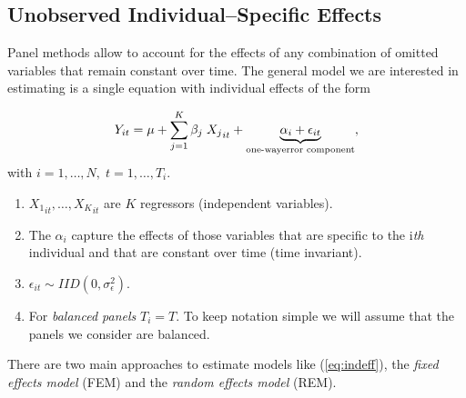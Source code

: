 \documentclass[landscape,letterpaper,9pt]{article}
\begin{document}
\newpage
\subsection{Unobserved Individual--Specific Effects}
Panel methods allow to account for the effects of any combination of
omitted variables that remain constant over time.
The general model we are interested in estimating is a single equation
with individual effects of the form

\begin{equation}\label{eq:modd}
Y_{it} = \mu +
\sum_{j= 1}^{K} \beta_{j} \; {X_{j}}_{it} + \underbrace{\alpha_i +\epsilon_{it}}_{\text{one-way\\ error component} },
\end{equation}
%
%
with \(i=1, \ldots, N, \; t= 1, \ldots, T_i\).
\begin{enumerate}
\item ${X_{1}}_{it}, \ldots, {X_{K}}_{it}$ are \(K\) regressors (independent variables).
\item The \(\alpha_i\)
capture the effects of those variables that are specific to the i\emph{th} individual
and that are constant over time (time invariant).
\item \(\epsilon_{it} \sim IID(0,\sigma^2_\epsilon) \).
\item  For \emph{balanced panels} \(T_i=T\). To keep notation simple we will
 assume that the panels we consider  are balanced.
\end{enumerate}

There are two main approaches to estimate models like (\ref{eq:indeff}), the \emph{fixed effects model} (FEM)  and the
\emph{random effects model} (REM).

\newpage
\end{document}
